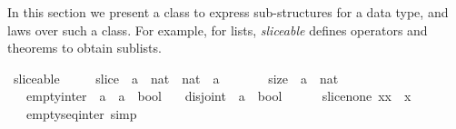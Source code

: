 %
\begin{isabellebody}%
%
%
\isamarkuptrue%
%
\begin{isamarkuptext}%
\label{sec:theory-sliceable}%
\end{isamarkuptext}\isamarkuptrue%
%
\isadelimtheory
%
\endisadelimtheory
%
\isatagtheory
%
\endisatagtheory
{\isafoldtheory}%
%
\isadelimtheory
%
\endisadelimtheory
%
\begin{isamarkuptext}%
In this section we present a class to express sub-structures for a data type, and laws over such a class.
  For example, for lists, \emph{sliceable} defines operators and theorems to obtain sublists.%
\end{isamarkuptext}\isamarkuptrue%
\isamarkupfalse%
\ sliceable\ {\isacharequal}\ \isanewline
\ \ \ slice\ {\isacharcolon}{\isacharcolon}\ {\isachardoublequoteopen}{\isacharprime}a\ {\isasymRightarrow}\ nat\ {\isasymRightarrow}\ nat\ {\isasymRightarrow}\ {\isacharprime}a{\isachardoublequoteclose}\ {\isacharparenleft}{\isachardoublequoteopen}{\isacharparenleft}{}{\isacharunderscore}{\isasymdagger}{\isacharunderscore}{\isachardot}{\isachardot}{\isacharunderscore}{\isacharparenright}{\isachardoublequoteclose}\ \ {\isacharbrackleft}{}{}{\isacharcomma}{}{}{\isacharcomma}{}{}{\isacharbrackright}\ {}{}{\isacharparenright}\isanewline
\ \ \ size\ {\isacharcolon}{\isacharcolon}\ {\isachardoublequoteopen}{\isacharprime}a\ {\isasymRightarrow}\ nat{\isachardoublequoteclose}\ {\isacharparenleft}{\isachardoublequoteopen}{\isacharparenleft}{}{\isacharhash}{\isacharunderscore}{\isacharparenright}{\isachardoublequoteclose}\ {}{}{\isacharparenright}\isanewline
\ \ \ empty{\isacharunderscore}inter\ {\isacharcolon}{\isacharcolon}\ {\isachardoublequoteopen}{\isacharprime}a\ {\isasymRightarrow}\ {\isacharprime}a\ {\isasymRightarrow}\ bool{\isachardoublequoteclose}\isanewline
\ \ \ disjoint\ {\isacharcolon}{\isacharcolon}\ {\isachardoublequoteopen}{\isacharprime}a\ {\isasymRightarrow}\ bool{\isachardoublequoteclose}\isanewline
\ \ \isanewline
\ \ \ slice{\isacharunderscore}none{\isacharcolon}\ {\isachardoublequoteopen}x{\isasymdagger}{}{\isachardot}{\isachardot}{\isacharparenleft}{\isacharhash}x{\isacharparenright}\ {\isacharequal}\ x{\isachardoublequoteclose}\isanewline
\ \ \ empty{\isacharunderscore}seq{\isacharunderscore}inter\ {\isacharbrackleft}simp{\isacharbrackright}{\isacharcolon}\ \isanewline

\end{isabellebody}

